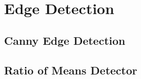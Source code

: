 











\section{Edge Detection}

\subsection{Canny Edge Detection}
\ifitkFullVersion

\fi

\subsection{Ratio of Means Detector }






